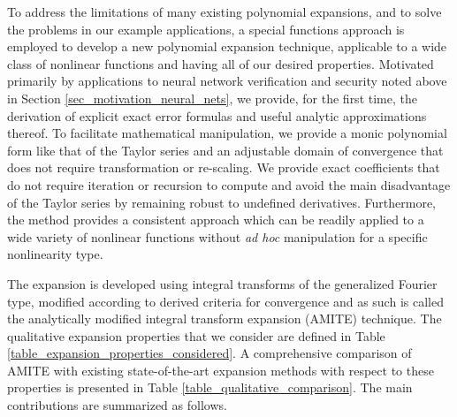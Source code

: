 To address the limitations of many existing polynomial expansions, and to solve the problems in our example applications, a special functions approach is employed to develop a new polynomial expansion technique, applicable to a wide class of nonlinear functions and having all of our desired properties.  Motivated primarily by applications to neural network verification and security noted above in Section \ref{sec_motivation_neural_nets}, we provide, for the first time, the derivation of explicit exact error formulas and useful analytic approximations thereof.  To facilitate mathematical manipulation, we provide a monic polynomial form like that of the Taylor series and an adjustable domain of convergence that does not require transformation or re-scaling.  We provide exact coefficients that do not require iteration or recursion to compute and avoid the main disadvantage of the Taylor series by remaining robust to undefined derivatives.  Furthermore, the method provides a consistent approach which can be readily applied to a wide variety of nonlinear functions without \emph{ad hoc} manipulation for a specific nonlinearity type.

The expansion is developed using integral transforms of the generalized Fourier type, modified according to derived criteria for convergence and as such is called the analytically modified integral transform expansion
(AMITE) technique. The qualitative expansion properties that we consider are defined in Table \ref{table_expansion_properties_considered}.  A comprehensive comparison of AMITE with existing state-of-the-art
expansion methods with respect to these properties is presented in Table \ref{table_qualitative_comparison}.  The main contributions are summarized as follows.


